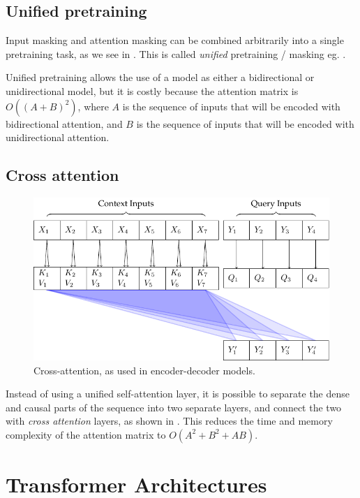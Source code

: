\subsection{Unified pretraining}
\label{ss:unified}

Input masking and attention masking can be combined arbitrarily into a single pretraining task, as we see in . This is called \textit{unified} pretraining / masking eg. \cite{unilm,t5}.

Unified pretraining allows the use of a model as either a bidirectional or unidirectional model, but it is costly because the attention matrix is $O((A+B)^2)$, where $A$ is the sequence of inputs that will be encoded with bidirectional attention, and $B$ is the sequence of inputs that will be encoded with unidirectional attention.

\subsection{Cross attention}
\label{ss:cross-attn}

\begin{figure}
    \centering
    \includegraphics[]{figures/attn-2-cross.pdf}
    \caption[Cross-attention]{Cross-attention, as used in encoder-decoder models.}
    \hrulefill
    \label{fig:cross-attn}
\end{figure}

Instead of using a unified self-attention layer, it is possible to separate the dense and causal parts of the sequence into two separate layers, and connect the two with \textit{cross attention} layers, as shown in . This reduces the time and memory complexity of the attention matrix to $O(A^2 + B^2 + AB)$.

\section{Transformer Architectures}

